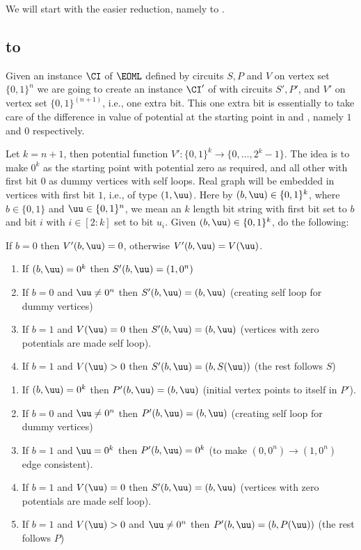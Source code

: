 We will start with the easier reduction, namely \EOML to \EOPL.
\subsection{\EOML to \EOPL}
Given an instance $\CI$ of $\EOML$ defined by circuits $S,P$ and $V$ on vertex set $\{0,1\}^n$ we are going to create an instance $\CI'$ of \EOPL with circuits $S',P'$, and $V'$ on vertex set $\{0,1\}^(n+1)$, i.e., one extra bit. 
This one extra bit is essentially to take care of the difference in value of potential at the starting point in \EOML and \EOPL, namely $1$ and $0$ respectively. 

Let $k=n+1$, then potential function $V':\{0,1\}^k \rightarrow \{0,\dots,2^k-1\}$. 
The idea is to make $0^k$ as the starting point with potential zero as required, and all other with first bit $0$ as dummy vertices with self loops. Real graph will be embedded in vertices with first bit $1$, i.e., of type $(1,\uu)$. Here by $(b,\uu)\in \{0,1\}^k$, where $b\in \{0,1\}$ and $\uu\in \{0,1\}^n$, we mean an $k$ length bit string with first bit set to $b$ and bit $i$ with $i\in[2:k]$ set to bit $u_i$. Given $(b,\uu)\in \{0,1\}^k$, do the following:
\medskip

 If $b=0$ then $V'(b,\uu)=0$, otherwise $V'(b,\uu)=V(\uu)$. 
\medskip

\begin{enumerate}
\item If $(b,\uu)=0^k$ then $S'(b,\uu)=(1,0^n)$
\item If $b=0$ and $\uu\neq 0^n$ then $S'(b,\uu)=(b,\uu)$ (creating self loop for dummy vertices)
\item If $b=1$ and $V(\uu)=0$ then $S'(b,\uu)=(b,\uu)$ (vertices with zero potentials are made self loop).
\item If $b=1$ and $V(\uu)>0$ then $S'(b,\uu)=(b,S(\uu))$ (the rest follows $S$)
\end{enumerate}


\begin{enumerate}
\item If $(b,\uu)=0^k$ then $P'(b,\uu)=(b,\uu)$ (initial vertex points to itself in $P'$).
\item If $b=0$ and $\uu\neq 0^n$ then $P'(b,\uu)=(b,\uu)$ (creating self loop for dummy vertices)
\item If $b=1$ and $\uu=0^k$ then $P'(b,\uu)=0^k$ (to make $(0,0^n)\rightarrow (1,0^n)$ edge consistent).
\item If $b=1$ and $V(\uu)=0$ then $S'(b,\uu)=(b,\uu)$ (vertices with zero potentials are made self loop).
\item If $b=1$ and $V(\uu)>0$ and $\uu \neq 0^n$ then $P'(b,\uu)=(b,P(\uu))$ (the rest follows $P$)
\end{enumerate}

